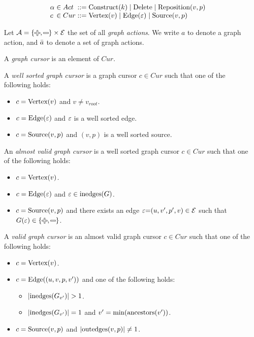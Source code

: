 \[
  \arraycolsep=0pt
  \begin{array}{lcllll}
    \alpha & {}\in{} & Act & {}::={} &
      \Construct{k}
      \mid \Delete
      \mid \Reposition{v}{p}
    \\
    c & {}\in{} & Cur & {}::={} &
      \CVertex{v}
      \mid \CEdge{\e}
      \mid \CSource{v}{p}
    \\
  \end{array}
\]

Let $\A = \SetOf{\Plus, \Minus} \times \E$ the set of all \emph{graph actions}.
We write $a$ to denote a graph action, and $\bar{a}$ to denote a set of graph actions.

\begin{definition}
  A \emph{graph cursor} is an element of $Cur$.
\end{definition}

\begin{definition}
  A \emph{well sorted graph cursor} is a graph cursor $c \in Cur$
  such that one of the following holds:
  \begin{itemize}
    \item $c = \text{Vertex}\mathopen{}\left(v\right)\mathclose{}$ and $v \neq v_{root}$.
    \item $c = \text{Edge}\mathopen{}\left(\varepsilon\right)\mathclose{}$ and $\varepsilon$ is a well sorted edge.
    \item $c = \text{Source}\mathopen{}\left(v, p\right)\mathclose{}$ and $(v, p)$ is a well sorted source.
  \end{itemize}
\end{definition}

\begin{definition}
  An \emph{almost valid graph cursor} is a well sorted graph cursor $c \in Cur$
  such that one of the following holds:
  \begin{itemize}
    \item $c = \text{Vertex}\mathopen{}\left(v\right)\mathclose{}$.
    \item $c = \text{Edge}\mathopen{}\left(\varepsilon\right)\mathclose{}$ and $\varepsilon \in \text{inedges}\mathopen{}\left(G\right)\mathclose{}$.
    \item $c = \text{Source}\mathopen{}\left(v, p\right)\mathclose{}$
      and there exists an edge $\varepsilon{=}(u, v', p', v) \in \mathcal{E}$
      such that $G(\e) \in \SetOf{\Plus, \Minus}$.
  \end{itemize}
\end{definition}

\begin{definition}
  A \emph{valid graph cursor} is an almost valid graph cursor $c \in Cur$
  such that one of the following holds:
  \begin{itemize}
    \item $c = \text{Vertex}\mathopen{}\left(v\right)\mathclose{}$.
    \item $c = \text{Edge}\mathopen{}\left((u, v, p, v')\right)\mathclose{}$ and one of the following holds:
    \begin{itemize}
      \item $\left\lvert\text{inedges}\mathopen{}\left(G_{v'}\right)\mathclose{}\right\rvert > 1$.
      \item $\left\lvert\text{inedges}\mathopen{}\left(G_{v'}\right)\mathclose{}\right\rvert = 1$ and $v' = \operatorname{\text{min}}\mathopen{}\left(\operatorname{\text{ancestors}}\mathopen{}\left(v'\right)\mathclose{}\right)\mathclose{}$.
    \end{itemize}
    \item $c = \text{Source}\mathopen{}\left(v, p\right)\mathclose{}$ and $\left\lvert\operatorname{\text{outedges}}\mathopen{}\left(v, p\right)\mathclose{}\right\rvert \neq 1$.
  \end{itemize}
\end{definition}

